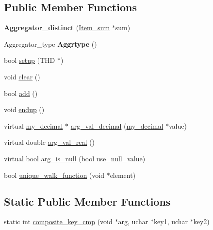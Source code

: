 \subsection*{Public Member Functions}
\begin{DoxyCompactItemize}
\item 
\mbox{\label{classAggregator__distinct_afbd34da51092275ff762e357fcbb8468}} 
{\bfseries Aggregator\+\_\+distinct} (\mbox{\hyperlink{classItem__sum}{Item\+\_\+sum}} $\ast$sum)
\item 
\mbox{\label{classAggregator__distinct_a9e2d407eac6d9e1996c302a4861d9f0c}} 
Aggregator\+\_\+type {\bfseries Aggrtype} ()
\item 
bool \mbox{\hyperlink{classAggregator__distinct_ac01d658918e5e160779ccfaf1134943b}{setup}} (T\+HD $\ast$)
\item 
void \mbox{\hyperlink{classAggregator__distinct_acb3c9529bc839900fc63eb890a5e2aee}{clear}} ()
\item 
bool \mbox{\hyperlink{classAggregator__distinct_af72d7cc1082245015c41e99893992a4f}{add}} ()
\item 
void \mbox{\hyperlink{classAggregator__distinct_a474d5f42f784572ea3b7d28be0fc3b2e}{endup}} ()
\item 
virtual \mbox{\hyperlink{classmy__decimal}{my\+\_\+decimal}} $\ast$ \mbox{\hyperlink{classAggregator__distinct_a60e5fc048746277c661ce97e9fc92905}{arg\+\_\+val\+\_\+decimal}} (\mbox{\hyperlink{classmy__decimal}{my\+\_\+decimal}} $\ast$value)
\item 
virtual double \mbox{\hyperlink{classAggregator__distinct_a3485cfa42d584711c4c95a3405f4a2ad}{arg\+\_\+val\+\_\+real}} ()
\item 
virtual bool \mbox{\hyperlink{classAggregator__distinct_a213b0657e2fcd03305629d78c68b31ad}{arg\+\_\+is\+\_\+null}} (bool use\+\_\+null\+\_\+value)
\item 
bool \mbox{\hyperlink{classAggregator__distinct_abc8b41d0e322a1d475f69e7008818dfc}{unique\+\_\+walk\+\_\+function}} (void $\ast$element)
\end{DoxyCompactItemize}
\subsection*{Static Public Member Functions}
\begin{DoxyCompactItemize}
\item 
static int \mbox{\hyperlink{classAggregator__distinct_ab74b7361e005d7c492dde7650774279b}{composite\+\_\+key\+\_\+cmp}} (void $\ast$arg, uchar $\ast$key1, uchar $\ast$key2)
\end{DoxyCompactItemize}
